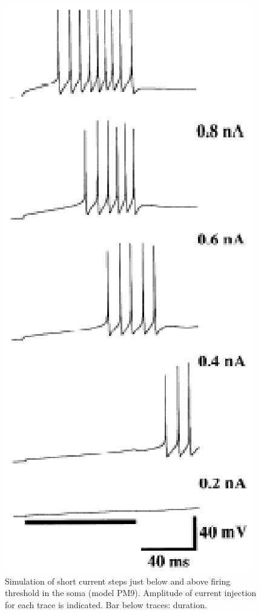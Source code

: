 \documentclass[12pt]{article}
\begin{document}
\begin{figure}[h]
\centering
   \includegraphics[scale=0.75]{figures/Fig.1.5.eps}
   \caption{Simulation of short current steps just below and above firing threshold in the soma (model PM9). Amplitude of current injection for each trace is indicated. Bar below traces: duration.}
   \label{fig:DS1.5}
\end{figure}
\end{document}
